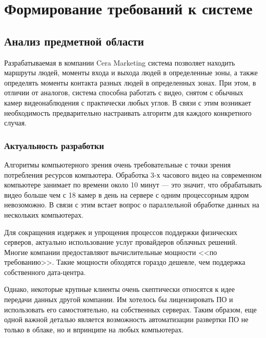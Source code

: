\chapter{Формирование требований к системе}

\section{Анализ предметной области}

Разрабатываемая в компании Cera Marketing система позволяет находить маршруты людей, моменты входа и выхода людей в определенные зоны, а также определять моменты контакта разных людей в определенных зонах. При этом, в отличии от аналогов, система способна работать с видео, снятом с обычных камер видеонаблюдения с практически любых углов. В связи с этим возникает необходимость предварительно настраивать алгоритм для каждого конкретного случая.




\subsection{Актуальность разработки}

Алгоритмы компьютерного зрения очень требовательные с точки зрения потребления ресурсов компьютера. Обработка 3-х часового видео на современном компьютере занимает по времени около 10 минут — это значит, что обрабатывать видео больше чем с 18 камер в день на сервере с одним процессорным ядром невозоможно. В связи с этим встает вопрос о параллельной обработке данных на нескольких компьютерах.

Для сокращения издержек и упрощения процессов поддержки физических серверов, актуально использование услуг провайдеров облачных решений. Многие компании предоставляют вычислительные мощности <<по требованию>>. Такие мощности обходятся гораздо дешевле, чем поддержка собственного дата-центра.

Однако, некоторые крупные клиенты очень скептически относятся к идее передачи данных другой компании. Им хотелось бы лицензировать ПО и использовать его самостоятельно, на собственных серверах. Таким образом, еще одной важной деталью является возможность автоматизации развертки ПО не только в облаке, но и впринципе на любых компьютерах.

